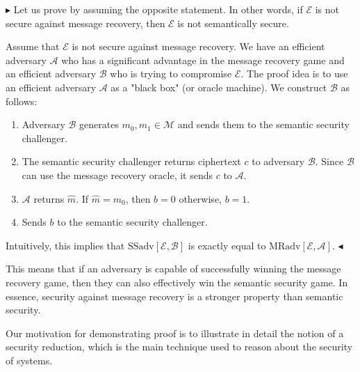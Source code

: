 \documentclass[../lecture-notes-148x210.tex]{subfiles}
\begin{document}
$\blacktriangleright$ 
Let us prove by assuming the opposite statement. 
In other words, if $\mathcal{E}$ is not secure against message recovery, then $\mathcal{E}$ is not semantically secure.

Assume that $\mathcal{E}$ is not secure against message recovery. 
We have an efficient adversary $\mathcal{A}$ who has a significant advantage in the 
message recovery game and an efficient adversary $\mathcal{B}$ who is trying to 
compromise $\mathcal{E}$.
The proof idea is to use an efficient adversary $\mathcal{A}$ as a "black box" (or oracle machine). %
We construct $\mathcal{B}$ as follows:
\begin{enumerate}
    \item Adversary $\mathcal{B}$ generates $m_0, m_1 \in \mathcal{M}$ and sends them to the semantic security challenger.
    \item The semantic security challenger returns ciphertext $c$ to adversary $\mathcal{B}$. Since $\mathcal{B}$ can use 
    the message recovery oracle, it sends $c$ to $\mathcal{A}$. 
    \item $\mathcal{A}$ returns $\hat{m}$. If $\hat{m} = m_0$, then $b = 0$ otherwise, $b = 1$.
    \item Sends $b$ to the semantic security challenger. 
\end{enumerate}

Intuitively, this implies that $\text{SSadv}[\mathcal{E}, \mathcal{B}]$ is exactly equal 
to $\text{MRadv}[\mathcal{E}, \mathcal{A}]$. $\blacktriangleleft$

This means that if an adversary is capable of successfully winning the 
message recovery game, then they can also effectively win the semantic security game.
In essence, security against message recovery is a stronger property than
semantic security. 

Our motivation for demonstrating proof is to illustrate in detail the notion of a security
reduction, which is the main technique used to reason about the security of systems.
\end{document}
